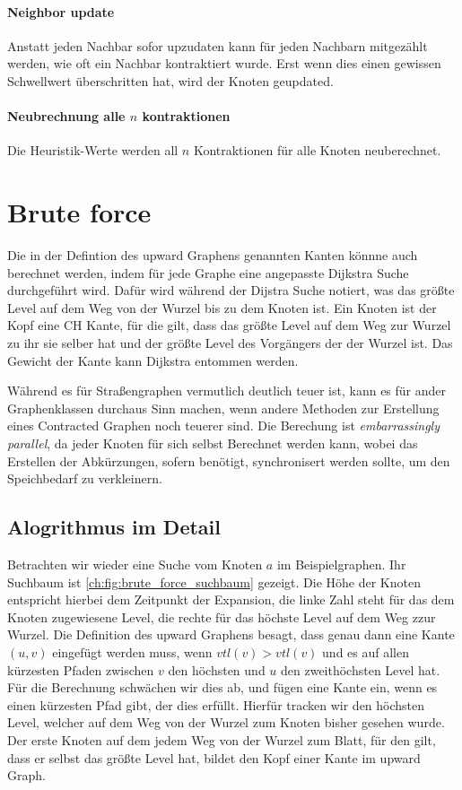 \paragraph{Neighbor update}
Anstatt jeden Nachbar sofor upzudaten kann für jeden Nachbarn mitgezählt werden, wie oft ein Nachbar kontraktiert wurde.
Erst wenn dies einen gewissen Schwellwert überschritten hat, wird der Knoten geupdated.

\paragraph{Neubrechnung alle $n$ kontraktionen}
Die Heuristik-Werte werden all $n$ Kontraktionen für alle Knoten neuberechnet.

\section{Brute force}

Die in der Defintion des upward Graphens genannten Kanten könnne auch berechnet werden, indem für jede Graphe eine angepasste Dijkstra Suche durchgeführt wird.
Dafür wird während der Dijstra Suche notiert, was das größte Level auf dem Weg von der Wurzel bis zu dem Knoten ist.
Ein Knoten ist der Kopf eine CH Kante, für die gilt, dass das größte Level auf dem Weg zur Wurzel zu ihr sie selber hat und der größte Level des Vorgängers der der Wurzel ist.
Das Gewicht der Kante kann Dijkstra entommen werden.

Während es für Straßengraphen vermutlich deutlich teuer ist, kann es für ander Graphenklassen durchaus Sinn machen, wenn andere Methoden zur Erstellung eines Contracted Graphen noch teuerer sind.
Die Berechung ist \emph{embarrassingly parallel}, da jeder Knoten für sich selbst Berechnet werden kann, wobei das Erstellen der Abkürzungen, sofern benötigt, synchronisert werden sollte, um den Speichbedarf zu verkleinern.


\subsection{Alogrithmus im Detail}

Betrachten wir wieder eine Suche vom Knoten $a$ im Beispielgraphen.
Ihr Suchbaum ist \autoref{ch:fig:brute_force_suchbaum} gezeigt.
Die Höhe der Knoten entspricht hierbei dem Zeitpunkt der Expansion, die linke Zahl steht für das dem Knoten zugewiesene Level, die rechte für das höchste Level auf dem Weg zzur Wurzel.
Die Definition des upward Graphens besagt, dass genau dann eine Kante $(u, v)$ eingefügt werden muss, wenn ${vtl}(v) > {vtl}(v)$ und es auf allen kürzesten Pfaden zwischen $v$ den höchsten und $u$ den zweithöchsten Level hat.
Für die Berechnung schwächen wir dies ab, und fügen eine Kante ein, wenn es einen kürzesten Pfad gibt, der dies erfüllt.
Hierfür tracken wir den höchsten Level, welcher auf dem Weg von der Wurzel zum Knoten bisher gesehen wurde.
Der erste Knoten auf dem jedem Weg von der Wurzel zum Blatt, für den gilt, dass er selbst das größte Level hat, bildet den Kopf einer Kante im upward Graph.


